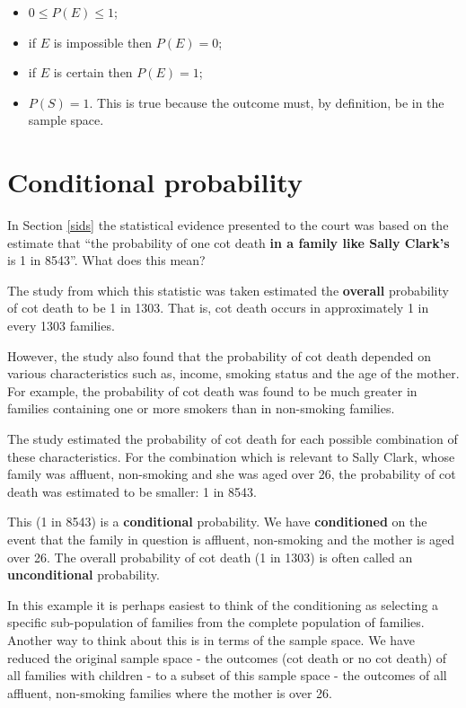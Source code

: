 \documentclass[
  british,
]{book}
\providecommand{\tightlist}{%
  \setlength{\itemsep}{0pt}\setlength{\parskip}{0pt}}
\begin{document}
\begin{itemize}
\tightlist
\item
  \(0 \leq P(E) \leq 1\);
\item
  if \(E\) is impossible then \(P(E)=0\);
\item
  if \(E\) is certain then \(P(E)=1\);
\item
  \(P(S)=1\). This is true because the outcome must, by definition, be in the sample space.
\end{itemize}

\hypertarget{conditional-probability}{%
\section{Conditional probability}\label{conditional-probability}}

In Section \ref{sids} the statistical evidence presented to the court was based on the estimate that ``the probability of one cot death \textbf{in a family like Sally Clark's} is 1 in 8543''. What does this mean?

The study from which this statistic was taken estimated the \textbf{overall} probability of cot death to be 1 in 1303. That is, cot death occurs in approximately 1 in every 1303 families.

However, the study also found that the probability of cot death depended on various characteristics such as, income, smoking status and the age of the mother. For example, the probability of cot death was found to be much greater in families containing one or more smokers than in non-smoking families.

The study estimated the probability of cot death for each possible combination of these characteristics. For the combination which is relevant to Sally Clark, whose family was affluent, non-smoking and she was aged over 26, the probability of cot death was estimated to be smaller: 1 in 8543.

This (1 in 8543) is a \textbf{conditional} probability. We have \textbf{conditioned} on the event that the family in question is affluent, non-smoking and the mother is aged over 26. The overall probability of cot death (1 in 1303) is often called an \textbf{unconditional} probability.

In this example it is perhaps easiest to think of the conditioning as selecting a specific sub-population of families from the complete population of families. Another way to think about this is in terms of the sample space. We have reduced the original sample space - the outcomes (cot death or no cot death) of all families with children - to a subset of this sample space - the outcomes of all affluent, non-smoking families where the mother is over 26.
\end{document}
